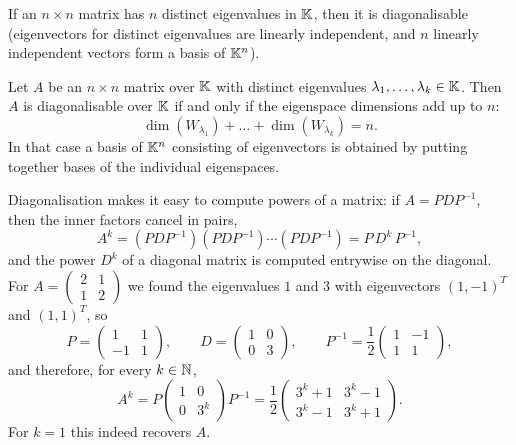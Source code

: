 \begin{corollary}
If an $n\times n$ matrix has $n$ distinct eigenvalues in $\mathbb{K}$, then it is diagonalisable (eigenvectors for
distinct eigenvalues are linearly independent, and $n$ linearly independent vectors form a basis of $\mathbb{K}^n$).
\end{corollary}

\begin{theorem}
Let $A$ be an $n\times n$ matrix over $\mathbb{K}$ with distinct eigenvalues $\lambda_1,\ldots,\lambda_k\in\mathbb{K}$.
Then $A$ is diagonalisable over $\mathbb{K}$ if and only if the eigenspace dimensions add up to $n$:
\[
\dim(W_{\lambda_1}) + \ldots + \dim(W_{\lambda_k}) = n.
\]
In that case a basis of $\mathbb{K}^n$ consisting of eigenvectors is obtained by putting together bases of the
individual eigenspaces.
\end{theorem}

\begin{example}
Diagonalisation makes it easy to compute powers of a matrix: if $A = P D P^{-1}$, then the inner factors
cancel in pairs,
\[
A^k = (PDP^{-1})(PDP^{-1})\cdots (PDP^{-1}) = P\, D^k\, P^{-1},
\]
and the power $D^k$ of a diagonal matrix is computed entrywise on the diagonal. For
$A = \left( \begin{smallmatrix} 2 & 1\\ 1 & 2 \end{smallmatrix} \right)$ we found the eigenvalues $1$ and
$3$ with eigenvectors $(1,-1)^T$ and $(1,1)^T$, so
\[
P = \left( \begin{array}{cc} 1 & 1\\ -1 & 1 \end{array} \right), \qquad
D = \left( \begin{array}{cc} 1 & 0\\ 0 & 3 \end{array} \right), \qquad
P^{-1} = \frac12\left( \begin{array}{cc} 1 & -1\\ 1 & 1 \end{array} \right),
\]
and therefore, for every $k\in\mathbb{N}$,
\[
A^k = P \left( \begin{array}{cc} 1 & 0\\ 0 & 3^k \end{array} \right) P^{-1}
= \frac12 \left( \begin{array}{cc} 3^k+1 & 3^k-1\\ 3^k-1 & 3^k+1 \end{array} \right).
\]
For $k=1$ this indeed recovers $A$.
\end{example}

